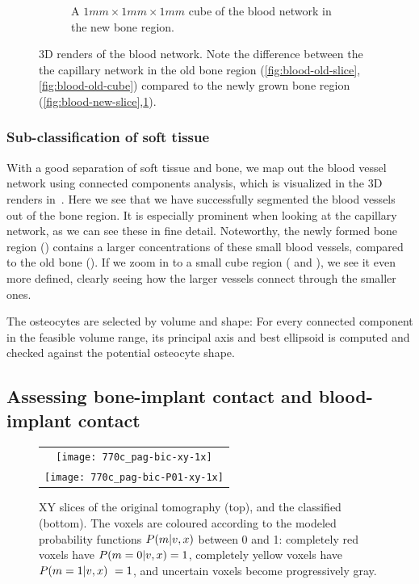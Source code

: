 \documentclass[pdflatex,sn-mathphys]{sn-jnl}%
\theoremstyle{thmstyleone}%
\theoremstyle{thmstyletwo}%
\theoremstyle{thmstylethree}%
\begin{document}
\begin{figure}
\begin{subfigure}[b]{.48\linewidth}
        \caption{A $1mm \times 1 mm \times 1 mm$ cube of the blood network in the new bone region.}
        \label{fig:blood-new-cube}
    \end{subfigure}
    \caption{3D renders of the blood network. Note the difference between the the capillary network in the old bone region (\ref{fig:blood-old-slice},\ref{fig:blood-old-cube}) compared to the newly grown bone region (\ref{fig:blood-new-slice},\ref{fig:blood-new-cube}).}
    \label{fig:blood-network}
\end{figure}

\subsubsection{Sub-classification of soft tissue}

With a good separation of soft tissue and bone, we map out the blood vessel network using connected
components analysis, which is visualized in the 3D renders in~.
Here we see that we have successfully segmented the blood vessels out of the bone region.
It is especially prominent when looking at the capillary network, as we can see these in fine detail.
Noteworthy, the newly formed bone region () contains a larger concentrations of these small blood vessels, compared to the old bone ().
If we zoom in to a small cube region ( and ), we see it even more defined, clearly seeing how the larger vessels connect through the smaller ones.

The osteocytes are selected by volume and shape: For every connected component
in the feasible volume range, its principal axis and best ellipsoid is computed and checked against
the potential osteocyte shape.

\subsection{Assessing bone-implant contact and blood-implant contact}

\begin{figure}
  \centering
  \begin{tabular}{c}
    \texttt{[image: 770c\_pag-bic-xy-1x]} \\
    \texttt{[image: 770c\_pag-bic-P01-xy-1x]}
  \end{tabular}
  \caption{XY slices of the original tomography (top), and the classified (bottom). The voxels are coloured according to the modeled probability functions $P(m\vert v,x)$ between 0 and 1: completely red voxels have $P(m=0\vert v,x) = 1$, completely yellow voxels have $P(m=1\vert v,x)\ = 1$, and uncertain voxels become progressively gray.
  }
  \label{fig:histology-comparison1}
\end{figure}
\end{document}
